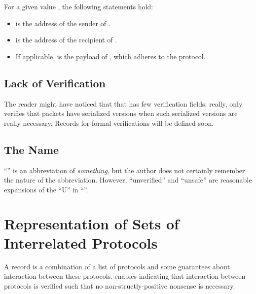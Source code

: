 \documentclass{report}
\begin{document}
For a given   value , the following statements hold:
\begin{itemize}
  \item {}  is the address of the sender of .
  \item {}  is the address of the recipient of .
  \item If applicable,   is the payload of , which adheres to the   protocol.
\end{itemize}

\section{Lack of Verification}
The reader might have noticed that that  has few verification fields; really,  only verifies that packets have serialized versions when such serialized versions are really necessary.  Records for formal verifications will be defined soon.

\section{The Name}
``'' is an abbreviation of \emph{something}, but the author does not certainly remember the nature of the abbreviation.  However, ``unverified'' and ``unsafe'' are reasonable expansions of the ``U'' in ``''.

\chapter{Representation of Sets of Interrelated Protocols}
A  record is a combination of a list of protocols and some guarantees about interaction between these protocols.   enables indicating that interaction between protocols is verified such that no non-structly-positive nonsense is necessary.
\end{document}
